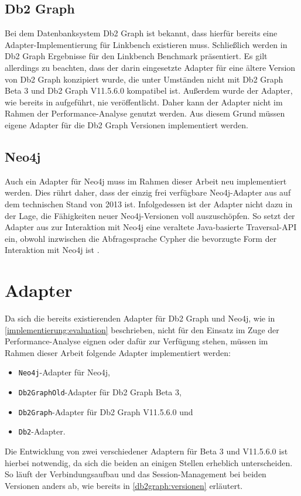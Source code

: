 \subsection{Db2 Graph}
\label{implementierung:evaluation:db2graph}
Bei dem Datenbanksystem Db2 Graph ist bekannt, dass hierfür bereits eine Adapter-Implementierung für Linkbench existieren muss. Schließlich werden in \cite{sigmod_tian} Db2 Graph Ergebnisse für den Linkbench Benchmark präsentiert. Es gilt allerdings zu beachten, dass der darin eingesetzte Adapter für eine ältere Version von Db2 Graph konzipiert wurde, die unter Umständen nicht mit Db2 Graph Beta 3 und Db2 Graph V11.5.6.0 kompatibel ist. Außerdem wurde der Adapter, wie bereits in  aufgeführt, nie veröffentlicht. Daher kann der Adapter nicht im Rahmen der Performance-Analyse genutzt werden. Aus diesem Grund müssen eigene Adapter für die Db2 Graph Versionen implementiert werden. 

\subsection{Neo4j}
\label{implementierung:evaluation:neo4j}
Auch ein Adapter für Neo4j muss im Rahmen dieser Arbeit neu implementiert werden. Dies rührt daher, dass der einzig frei verfügbare Neo4j-Adapter aus \cite{neo_linkbench_github} auf dem technischen Stand von 2013 ist. Infolgedessen ist der Adapter nicht dazu in der Lage, die Fähigkeiten neuer Neo4j-Versionen voll auszuschöpfen. So setzt der Adapter aus \cite{neo_linkbench_github} zur Interaktion mit Neo4j eine veraltete Java-basierte Traversal-API ein, obwohl inzwischen die Abfragesprache Cypher die bevorzugte Form der Interaktion mit Neo4j ist \cite{gdbms}.

\section{Adapter}
\label{implementierung:adapter}
Da sich die bereits existierenden Adapter für Db2 Graph und Neo4j, wie in \autoref{implementierung:evaluation} beschrieben, nicht für den Einsatz im Zuge der Performance-Analyse eignen oder dafür zur Verfügung stehen, müssen im Rahmen dieser Arbeit folgende Adapter implementiert werden:
\begin{itemize}
    \item \texttt{Neo4j}-Adapter für Neo4j,
    \item \texttt{Db2GraphOld}-Adapter für Db2 Graph Beta 3, 
    \item \texttt{Db2Graph}-Adapter für Db2 Graph V11.5.6.0 und
    \item \texttt{Db2}-Adapter.
\end{itemize}
Die Entwicklung von zwei verschiedener Adaptern für Beta 3 und V11.5.6.0 ist hierbei notwendig, da sich die beiden an einigen Stellen erheblich unterscheiden. So läuft der Verbindungsaufbau und das Session-Management bei beiden Versionen anders ab, wie bereits in \autoref{db2graph:versionen} erläutert. 

